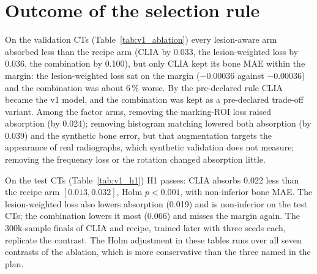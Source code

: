 \section{Outcome of the selection rule}
On the validation CTs (Table~\ref{tab:v1_ablation}) every lesion-aware arm absorbed less than the recipe arm (CLIA by 0.033, the
lesion-weighted loss by 0.036, the combination by 0.100), but only CLIA kept its bone MAE within the margin: the lesion-weighted loss sat on
the margin ($-0.00036$ against $-0.00036$) and the combination was about 6\,\% worse. By the pre-declared rule CLIA became the v1 model, and the
combination was kept as a pre-declared trade-off variant. Among the factor arms, removing the marking-ROI loss raised absorption (by 0.024); removing
histogram matching lowered both absorption (by 0.039) and the synthetic bone error, but that augmentation targets the appearance of real
radiographs, which synthetic validation does not measure; removing the frequency loss or the rotation changed absorption little.

On the test CTs (Table~\ref{tab:v1_h1}) H1 passes: CLIA absorbs 0.022 less than the recipe arm $[0.013,0.032]$, Holm $p<0.001$, with
non-inferior bone MAE. The lesion-weighted loss also lowers absorption (0.019) and is non-inferior on the test CTs; the combination lowers it most
(0.066) and misses the margin again. The 300k-sample finals of CLIA and recipe, trained later with three seeds each, replicate the contrast.
The Holm adjustment in these tables runs over all seven contrasts of the ablation, which is more conservative than the three named in the plan.
\begin{table}[htbp]
\centering\small
\caption{v1 ablation on synthetic validation CTs (selection data; three seeds each, 200k samples): every arm against the recipe arm.}
\label{tab:v1_ablation}
\end{table}
\begin{table}[htbp]
\centering\small
\caption{First analysis plan, H1: lesion-aware arms against the recipe arm on synthetic LIDC test CTs (three seeds each), and the 300k-sample
finals as a replication.}
\label{tab:v1_h1}
\end{table}

